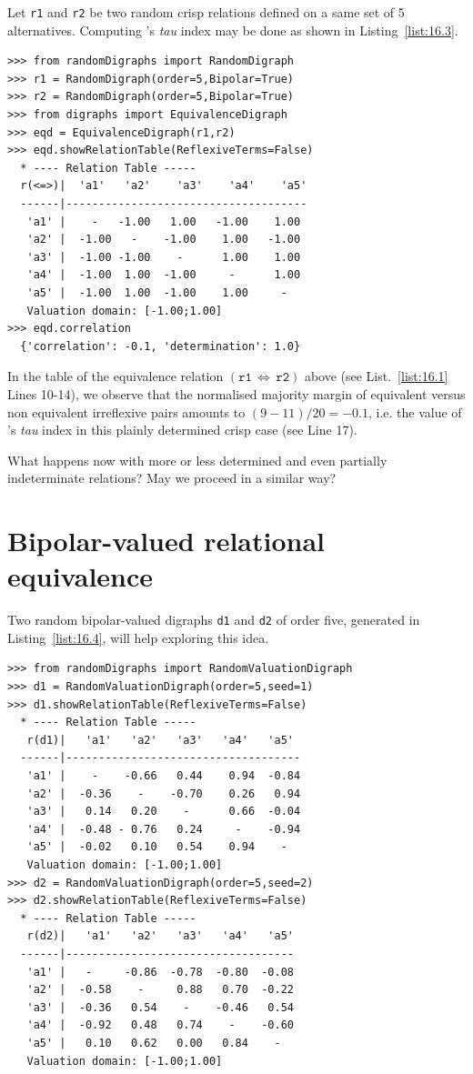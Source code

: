 Let \texttt{r1} and \texttt{r2} be two random crisp relations defined on a same set of 5 alternatives. Computing \Kendall 's \emph{tau} index may be done as shown in Listing~\vref{list:16.3}.
\begin{lstlisting}[caption={Computing a relational equivalence digraph},label=list:16.3]
>>> from randomDigraphs import RandomDigraph
>>> r1 = RandomDigraph(order=5,Bipolar=True)
>>> r2 = RandomDigraph(order=5,Bipolar=True)
>>> from digraphs import EquivalenceDigraph
>>> eqd = EquivalenceDigraph(r1,r2)
>>> eqd.showRelationTable(ReflexiveTerms=False)
  * ---- Relation Table -----
  r(<=>)|  'a1'	  'a2'	  'a3'	  'a4'	  'a5'	  
  ------|-------------------------------------
   'a1' |    -   -1.00   1.00   -1.00    1.00	 
   'a2' |  -1.00   -    -1.00    1.00   -1.00	 
   'a3' |  -1.00 -1.00    -      1.00    1.00	 
   'a4' |  -1.00  1.00  -1.00     -      1.00	 
   'a5' |  -1.00  1.00  -1.00    1.00     - 	 
   Valuation domain: [-1.00;1.00]
>>> eqd.correlation
  {'correlation': -0.1, 'determination': 1.0}
\end{lstlisting}

In the table of the equivalence relation $(\mathtt{r1}\, \Leftrightarrow\, \mathtt{r2})$ above (see List.~\vref{list:16.1} Lines 10-14), we observe that the normalised majority margin of equivalent versus non equivalent irreflexive pairs amounts to $(9 - 11)/20 = -0.1$, i.e. the value of \Kendall 's \emph{tau} index in this plainly determined crisp case (see Line 17).

What happens now with more or less determined and even partially indeterminate relations? May we proceed in a similar way?

\section{Bipolar-valued relational equivalence}
\label{sec:16.3}

Two random bipolar-valued digraphs \texttt{d1} and \texttt{d2} of order five, generated in Listing~\vref{list:16.4}, will help exploring this idea.
\begin{lstlisting}[caption={Two random bipolar-valued digraphs},label=list:16.4]
>>> from randomDigraphs import RandomValuationDigraph
>>> d1 = RandomValuationDigraph(order=5,seed=1)
>>> d1.showRelationTable(ReflexiveTerms=False)
  * ---- Relation Table -----
   r(d1)|   'a1'   'a2'   'a3'   'a4'   'a5'	  
  ------|------------------------------------
   'a1' |    - 	  -0.66	  0.44	  0.94	-0.84	 
   'a2' |  -0.36    - 	 -0.70	  0.26	 0.94	 
   'a3' |   0.14   0.20	   - 	  0.66	-0.04	 
   'a4' |  -0.48 - 0.76	  0.24	   -  	-0.94	 
   'a5' |  -0.02   0.10	  0.54	  0.94    - 	 
   Valuation domain: [-1.00;1.00]
>>> d2 = RandomValuationDigraph(order=5,seed=2)
>>> d2.showRelationTable(ReflexiveTerms=False)
  * ---- Relation Table -----
   r(d2)|   'a1'   'a2'   'a3'   'a4'   'a5'	  
  ------|-----------------------------------
   'a1' |   -     -0.86  -0.78  -0.80  -0.08	 
   'a2' |  -0.58    -     0.88   0.70  -0.22	 
   'a3' |  -0.36   0.54    -    -0.46   0.54	 
   'a4' |  -0.92   0.48   0.74    -    -0.60	 
   'a5' |   0.10   0.62   0.00   0.84    - 	 
   Valuation domain: [-1.00;1.00]
\end{lstlisting}


